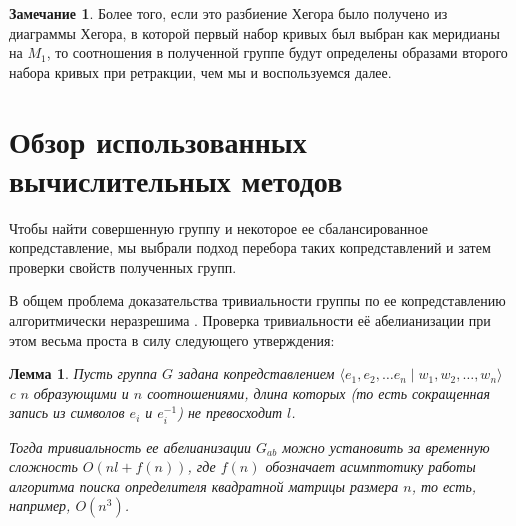 \documentclass[a4paper, 12pt]{article}
\newtheorem*{lemma}{Лемма}
\theoremstyle{definition}
\newtheorem{remark}{Замечание}
\begin{document}
        \begin{remark}{}
            \label{fgroup}
            Более того, если это разбиение Хегора было получено из диаграммы Хегора, в которой первый набор кривых был выбран как меридианы на $M_1$, то соотношения в полученной группе будут определены образами второго набора кривых при ретракции, чем мы и воспользуемся далее.
        \end{remark}
        
\section{Обзор использованных вычислительных методов}     
    Чтобы найти совершенную группу и некоторое ее сбалансированное копредставление, мы выбрали подход перебора таких копредставлений и затем проверки свойств полученных групп.

    В общем проблема доказательства тривиальности группы по ее копредставлению алгоритмически неразрешима \cite{Rabin1958}. Проверка тривиальности её абелианизации при этом весьма проста в силу следующего утверждения:

    \begin{lemma}
        Пусть группа $G$ задана копредставлением $\langle e_1, e_2, \dots e_n \mid w_1, w_2, \dots, w_n \rangle$ c $n$ образующими и $n$ соотношениями, длина которых (то есть сокращенная запись из символов $e_i$ и $e_i^{-1}$) не превосходит $l$.
        
        Тогда тривиальность ее абелианизации $G_{ab}$ можно установить за временную сложность $O(n l + f(n))$, где $f(n)$ обозначает асимптотику работы алгоритма поиска определителя квадратной матрицы размера $n$, то есть, например, $O(n^3)$.
    \end{lemma}
\end{document}
